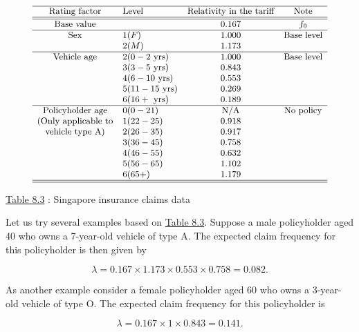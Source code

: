 \documentclass[]{book}
\theoremstyle{definition}
\theoremstyle{definition}
\theoremstyle{definition}
\theoremstyle{remark}
\begin{document}
\[
{\small 
\begin{matrix}
\begin{array}{clcc}
\hline
\text{Rating factor} & \text{Level} & \text{Relativity in the tariff} & \text{Note}\\ \hline\hline
\text{Base value}  &  & 0.167 & f_0\\ \hline
\text{Sex} & 1 (F) & 1.000 & \text{Base level}\\
 & 2 (M) & 1.173 &\\\hline
 \text{Vehicle age} & 2 (0-2\text{ yrs}) & 1.000 & \text{Base level}\\
  & 3 (3-5\text{ yrs}) & 0.843 \\
  & 4 (6-10\text{ yrs}) & 0.553 \\
  & 5 (11-15\text{ yrs}) & 0.269 \\
  & 6 (16+\text{ yrs}) & 0.189 &\\\hline
  \text{Policyholder age} & 0 (0-21) & \text{N/A} & \text{No policy} \\
  \text{(Only applicable to} & 1 (22-25) & 0.918 \\
 \text{vehicle type A)}  & 2 (26-35) & 0.917 \\
  & 3 (36-45) & 0.758 \\
  & 4 (46-55) & 0.632 \\
  & 5 (56-65) &  1.102\\
  & 6 (65+) & 1.179\\ \hline \hline
\end{array}
\end{matrix}
}
\]

\protect\hyperlink{tab:8.3}{Table 8.3} : Singapore insurance claims data

Let us try several examples based on \protect\hyperlink{tab:8.3}{Table
8.3}. Suppose a male policyholder aged 40 who owns a 7-year-old vehicle
of type A. The expected claim frequency for this policyholder is then
given by

\begin{equation}
\lambda=0.167 \times 1.173 \times 0.553 \times 0.758 = 0.082.
\end{equation}

As another example consider a female policyholder aged 60 who owns a
3-year-old vehicle of type O. The expected claim frequency for this
policyholder is

\begin{equation}
\lambda=0.167 \times 1 \times 0.843  = 0.141.
\end{equation}
\end{document}
